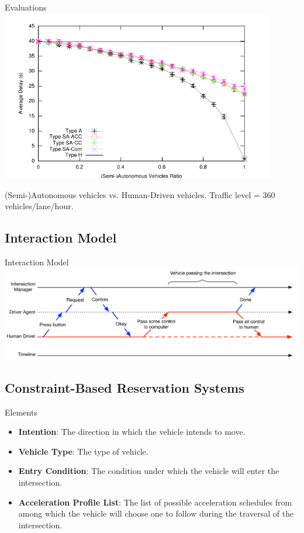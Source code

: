 \documentclass{beamer}
\begin{document}
\begin{frame}{Evaluations}
\includegraphics[width=0.9\textwidth]{figures/figure_1.pdf}

(Semi-)Autonomous vehicles vs. Human-Driven vehicles. Traffic
level = 360 vehicles/lane/hour.
\end{frame}

\subsection{Interaction Model}

\begin{frame}{Interaction Model}
\includegraphics[width=\textwidth]{figures/interaction}
\end{frame}

\subsection{Constraint-Based Reservation Systems}

\begin{frame}{Elements}
\begin{itemize}
\item{\bf Intention}: The direction in which the vehicle intends to
move.
\item{\bf Vehicle Type}: The type of vehicle.
\item{\bf Entry Condition}: The condition under which the vehicle will
enter the intersection.
\item{\bf Acceleration Profile List}: The list of possible
acceleration schedules from among which the vehicle will choose one to
follow during the traversal of the intersection.
\end{itemize}
\end{frame}
\end{document}
